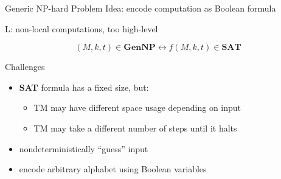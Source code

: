 \documentclass[11pt,usenames,dvipsnames,
hyperref={pdfencoding=auto,psdextra}]{beamer}
\newcommand*{\sat}{\textbf{SAT}}
\newcommand*{\gennp}{\textbf{GenNP}}
\begin{document}
\begin{frame}{Generic NP-hard Problem}
  Idea: encode computation as Boolean formula


  \begin{overlayarea}{\textwidth}{0.4\textwidth}
     {
      \vspace{3ex}
      \begin{center}
        L: non-local computations, too high-level \frownie{}
      \end{center}
    }

    \[ 
      (M, k, t) \in \gennp{} \leftrightarrow f(M, k, t) \in \sat{}
    \]
  \end{overlayarea}
\end{frame}

\begin{frame}[label=challenges]{Challenges}
  \begin{itemize}
    \item \sat{} formula has a fixed size, but: 
      \begin{itemize} 
        \item TM may have different space usage depending on input
        \item TM may take a different number of steps until it halts
      \end{itemize}
    \item nondeterministically ``guess'' input
    \item encode arbitrary alphabet using Boolean variables
  \end{itemize}
\end{frame}
\end{document}
